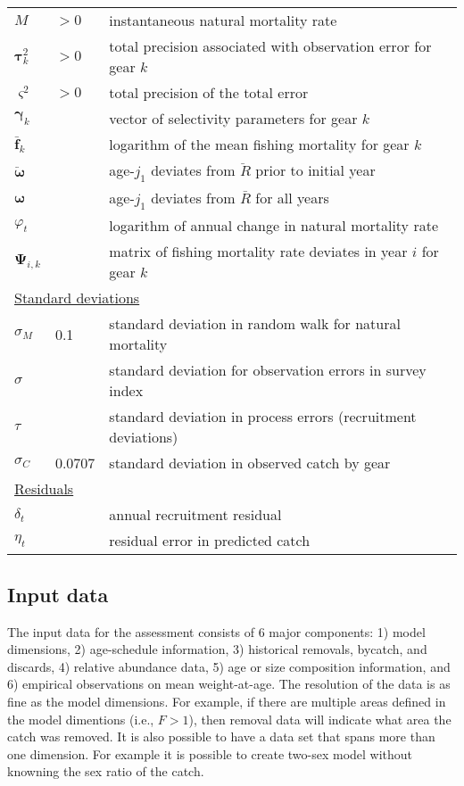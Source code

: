 \begin{center}
\begin{longtable}{lll}
$M$                 & $> 0$& instantaneous natural mortality rate \\
$\bm{\tau}^2_k$     & $> 0$& total precision associated with observation error for gear $k$\\
$\varsigma^2$       & $> 0$& total precision of the total error\\
$\bm{\gamma}_k$     &      & vector of selectivity parameters for gear $k$\\
$\bm{\bar{f}}_{k}$  &      & logarithm of the mean fishing mortality for gear $k$\\
$\bm{\ddot{\omega}}$&      & age-${j}_1$ deviates from $\ddot{R}$ prior to initial year\\
$\bm{\omega}$       &      & age-${j}_1$ deviates from $\bar{R}$ for all years \\
$\varphi_t$         &      & logarithm of annual change in natural mortality rate\\
$\bm{\Psi}_{i,k}$   &      & matrix of fishing mortality rate deviates in year $i$ for gear $k$\\
\multicolumn{3}{l}{\underline{Standard deviations}}\\
$\sigma_M$          &0.1    & standard deviation in random walk for natural mortality\\
$\sigma$            &       & standard deviation for observation errors in survey index\\
$\tau$              &       & standard deviation in process errors (recruitment deviations)\\
$\sigma_C$          &0.0707 & standard deviation in observed catch by gear\\
\multicolumn{3}{l}{\underline{Residuals}}\\
$\delta_t$      &   & annual recruitment residual\\
$\eta_t$        &   & residual error in predicted catch\\


\end{longtable}
\end{center}


\subsection{Input data} %
\label{sub:input_data}
    The input data for the assessment consists of 6 major components: 1) model dimensions, 2) age-schedule information, 3) historical removals, bycatch, and discards, 4) relative abundance data, 5) age or size composition information, and 6) empirical observations on mean weight-at-age.  The resolution of the data is as fine as the model dimensions.  For example, if there are multiple areas defined in the model dimentions (i.e., $F>1$), then removal data will indicate what area the catch was removed.  It is also possible to have a data set that spans more than one dimension.  For example it is possible to create two-sex model without knowning the sex ratio of the catch.

